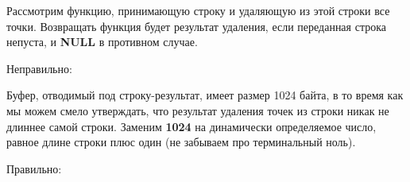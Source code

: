 \begin{typerror}
	\label{TE_not-using-dynarray-size}

	Рассмотрим функцию, принимающую строку и удаляющую из этой строки все точки.
	Возвращать функция будет результат удаления, если переданная строка непуста, и \textbf{NULL} в противном случае.

	Неправильно:

	Буфер, отводимый под строку-результат, имеет размер 1024 байта,
	в то время как мы можем смело утверждать, что результат удаления точек из строки никак не длиннее самой строки.
	Заменим \textbf{1024} на динамически определяемое число, равное длине строки плюс один
	(не забываем про терминальный ноль).

	Правильно:

\end{typerror}
